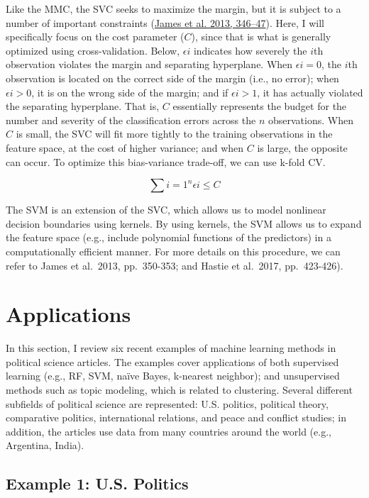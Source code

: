 \documentclass{book}
\begin{document}
Like the MMC, the SVC seeks to maximize the margin, but it is subject to a
number of important constraints (\protect\hyperlink{ref-james2013a}{James et
al. 2013, 346--47}). Here, I will specifically focus on the cost parameter
(\(C\)), since that is what is generally optimized using cross-validation.
Below, \(\epsilon {i}\) indicates how severely the \(i\)th observation
violates the margin and separating hyperplane. When \(\epsilon {i}=0\), the
\(i\)th observation is located on the correct side of the margin (i.e., no
error); when \(\epsilon {i}>0\), it is on the wrong side of the margin; and if
\(\epsilon {i}>1\), it has actually violated the separating hyperplane. That
is, \(C\) essentially represents the budget for the number and severity of the
classification errors across the \(n\) observations. When \(C\) is small, the
SVC will fit more tightly to the training observations in the feature space,
at the cost of higher variance; and when \(C\) is large, the opposite can
occur. To optimize this bias-variance trade-off, we can use k-fold CV.

\[\sum {i=1}^{n} \epsilon {i} \leq C\]

The SVM is an extension of the SVC, which allows us to model nonlinear
decision boundaries using kernels. By using kernels, the SVM allows us to
expand the feature space (e.g., include polynomial functions of the
predictors) in a computationally efficient manner. For more details on this
procedure, we can refer to James et al.~2013, pp.~350-353; and Hastie et
al.~2017, pp.~423-426).

\hypertarget{applications-4}{%
\section{Applications}\label{applications-4}}

In this section, I review six recent examples of machine learning methods in
political science articles. The examples cover applications of both supervised
learning (e.g., RF, SVM, naïve Bayes, k-nearest neighbor); and unsupervised
methods such as topic modeling, which is related to clustering. Several
different subfields of political science are represented: U.S. politics,
political theory, comparative politics, international relations, and peace and
conflict studies; in addition, the articles use data from many countries
around the world (e.g., Argentina, India).

\hypertarget{example-1-u.s.-politics}{%
\subsection{Example 1: U.S. Politics}\label{example-1-u.s.-politics}}
\end{document}
